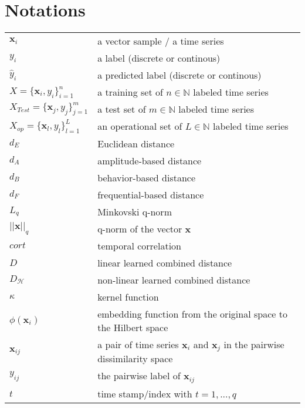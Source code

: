 \chapter*{Notations}
\label{chap:Notations}


\begin{tabular}{ll}
	$\textbf{x}_i$ 							& a vector sample / a time series \\ 
	$y_i$ 									& a label (discrete or continous) \\
	$\hat{y}_i$ 							& a predicted label (discrete or continous) \\
	$X = \{\textbf{x}_i , y_i\}_{i=1}^n$ & a training set of $n \in \mathbb{N}$ labeled time series\\
	$X_{Test}=\{\textbf{x}_j,y_j\}_{j=1}^m$ & a test set of $m \in \mathbb{N}$ labeled time series\\
	$X_{op}=\{\textbf{x}_l,y_l\}_{l=1}^L$ & an operational set of $L \in \mathbb{N}$ labeled time series\\
	$d_E$		& Euclidean distance \\
	$d_A$		& amplitude-based distance \\
	$d_B$		& behavior-based distance \\
	$d_F$		& frequential-based distance \\
	$L_q$		& Minkovski q-norm \\
	$||\textbf{x}||_q$	& q-norm of the vector $\textbf{x}$ \\
	$cort$  	& temporal correlation \\
	$D$ 		& linear learned combined distance \\
	$D_\mathcal{H}$ 		& non-linear learned combined distance \\
	$\kappa$	& kernel function \\
	$\phi(\textbf{x}_i)$ & embedding function from the original space to the Hilbert space  \\	
	$\textbf{x}_{ij}$ 	& a pair of time series $\textbf{x}_i$ and $\textbf{x}_j$ in the pairwise dissimilarity space \\
	$y_{ij}$			& the pairwise label of $\textbf{x}_{ij}$ \\
	$t$			& time stamp/index with $t=1,...,q$ \\

\end{tabular}
